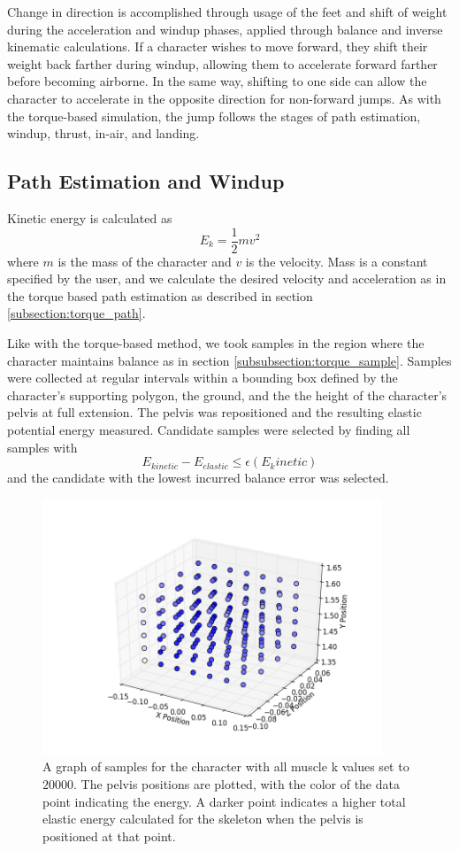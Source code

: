 Change in direction is accomplished through usage of the feet and shift of weight during the acceleration and windup phases, applied through balance and inverse kinematic calculations.  If a character wishes to move forward, they shift their weight back farther during windup, allowing them to accelerate forward farther before becoming airborne.  In the same way, shifting to one side can allow the character to accelerate in the opposite direction for non-forward jumps.  As with the torque-based simulation, the jump follows the stages of path estimation, windup, thrust, in-air, and landing.

\subsection{Path Estimation and Windup}
\label{subsection:energy_path}
Kinetic energy is calculated as \[ E_k = \frac{1}{2} m v^2 \] where $m$ is the mass of the character and $v$ is the velocity.  Mass is a constant specified by the user, and we calculate the desired velocity and acceleration as in the torque based path estimation as described in section \ref{subsection:torque_path}.

Like with the torque-based method, we took samples in the region where the character maintains balance as in section \ref{subsubsection:torque_sample}.  Samples were collected at regular intervals within a bounding box defined by the character's supporting polygon, the ground, and the the height of the character's pelvis at full extension.  The pelvis was repositioned and the resulting elastic potential energy measured.  Candidate samples were selected by finding all samples with \[ E_{kinetic} - E_{elastic} \le \epsilon(E_kinetic)\] and the candidate with the lowest incurred balance error was selected.

\begin{figure}[ht]
	\centering
	\includegraphics[width=4in]{images/K200000_global_dense.png}
	\caption[A plot of a sample field for energy based simulation]{A graph of samples for the character with all muscle k values set to $20000$.  The pelvis positions are plotted, with the color of the data point indicating the energy.  A darker point indicates a higher total elastic energy calculated for the skeleton when the pelvis is positioned at that point.}
	\label{fig:energy_samples}
\end{figure}

